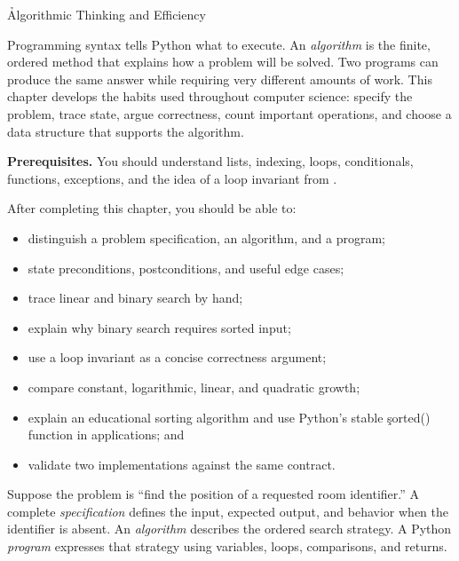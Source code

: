 
\h{Algorithmic Thinking and Efficiency}
\label{ch:16}

Programming syntax tells Python what to execute. An \emph{algorithm} is the
finite, ordered method that explains how a problem will be solved. Two programs
can produce the same answer while requiring very different amounts of work.
This chapter develops the habits used throughout computer science: specify the
problem, trace state, argue correctness, count important operations, and choose
a data structure that supports the algorithm.

\begin{NoteBox}
\textbf{Prerequisites.} You should understand lists, indexing, loops,
conditionals, functions, exceptions, and the idea of a loop invariant from
.
\end{NoteBox}

\begin{tcolorbox}[title=Learning outcomes,colframe=orange,colback=white,arc=2mm]
After completing this chapter, you should be able to:
\begin{itemize}
    \item distinguish a problem specification, an algorithm, and a program;
    \item state preconditions, postconditions, and useful edge cases;
    \item trace linear and binary search by hand;
    \item explain why binary search requires sorted input;
    \item use a loop invariant as a concise correctness argument;
    \item compare constant, logarithmic, linear, and quadratic growth;
    \item explain an educational sorting algorithm and use Python's stable
          \c{sorted()} function in applications; and
    \item validate two implementations against the same contract.
\end{itemize}
\end{tcolorbox}


Suppose the problem is ``find the position of a requested room identifier.'' A
complete \emph{specification} defines the input, expected output, and behavior
when the identifier is absent. An \emph{algorithm} describes the ordered search
strategy. A Python \emph{program} expresses that strategy using variables,
loops, comparisons, and returns.

